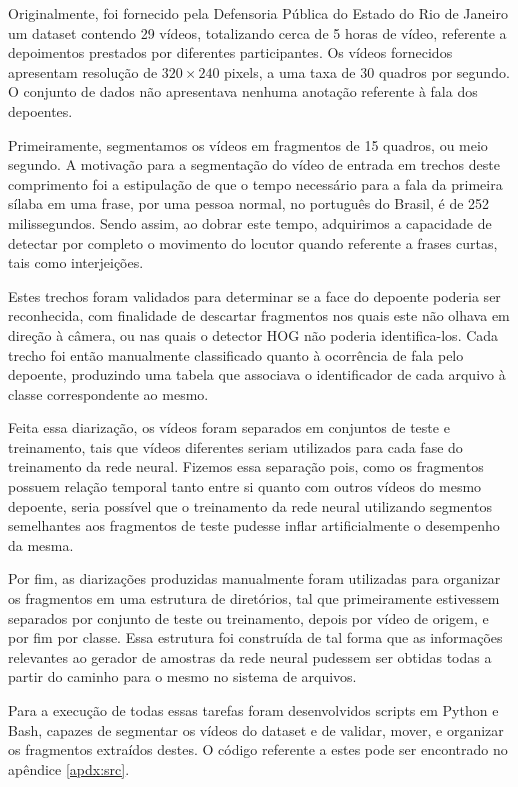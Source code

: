 Originalmente, foi fornecido pela Defensoria Pública do Estado do Rio de Janeiro um dataset contendo 29 vídeos, totalizando cerca de 5 horas de vídeo, referente a depoimentos prestados por diferentes participantes.
Os vídeos fornecidos apresentam resolução de $320\times240$ pixels, a uma taxa de 30 quadros por segundo.
O conjunto de dados não apresentava nenhuma anotação referente à fala dos depoentes.

Primeiramente, segmentamos os vídeos em fragmentos de 15 quadros, ou meio segundo.
A motivação para a segmentação do vídeo de entrada em trechos deste comprimento foi a estipulação de que o tempo necessário para a fala da primeira sílaba em uma frase, por uma pessoa normal, no português do Brasil, é de 252 milissegundos\cite{barbosaSyllabletimingBrazilianPortuguese2000}.
Sendo assim, ao dobrar este tempo, adquirimos a capacidade de detectar por completo o movimento do locutor quando referente a frases curtas, tais como interjeições.

Estes trechos foram validados para determinar se a face do depoente poderia ser reconhecida, com finalidade de descartar fragmentos nos quais este não olhava em direção à câmera, ou nas quais o detector HOG não poderia identifica-los.
Cada trecho foi então manualmente classificado quanto à ocorrência de fala pelo depoente, produzindo uma tabela que associava o identificador de cada arquivo à classe correspondente ao mesmo.

Feita essa diarização, os vídeos foram separados em conjuntos de teste e treinamento, tais que vídeos diferentes seriam utilizados para cada fase do treinamento da rede neural.
Fizemos essa separação pois, como os fragmentos possuem relação temporal tanto entre si quanto com outros vídeos do mesmo depoente, seria possível que o treinamento da rede neural utilizando segmentos semelhantes aos fragmentos de teste pudesse inflar artificialmente o desempenho da mesma.

Por fim, as diarizações produzidas manualmente foram utilizadas para organizar os fragmentos em uma estrutura de diretórios, tal que primeiramente estivessem separados por conjunto de teste ou treinamento, depois por vídeo de origem, e por fim por classe.
Essa estrutura foi construída de tal forma que as informações relevantes ao gerador de amostras da rede neural pudessem ser obtidas todas a partir do caminho para o mesmo no sistema de arquivos.

Para a execução de todas essas tarefas foram desenvolvidos scripts em Python e Bash, capazes de segmentar os vídeos do dataset e de validar, mover, e organizar os fragmentos extraídos destes.
O código referente a estes pode ser encontrado no apêndice \ref{apdx:src}.

